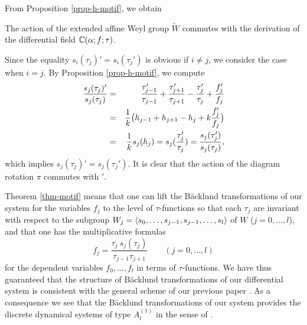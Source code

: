 From Proposition \ref{prop-h-motif}, we obtain 
\begin{thm}
The action of the extended affine Weyl group $\widetilde{W}$ commutes 
with the derivation of the differential field ${\Bbb C}(\alpha;f;\tau)$. 
\end{thm}
\begin{pf} Since the equality $s_i(\tau_j)'=s_i(\tau_j')$ is obvious if $i\ne j$, 
we consider the case when $i=j$.  
By Proposition \ref{prop-h-motif}, we compute 
\begin{eqnarray}
\frac{s_j(\tau_j)'}{s_j(\tau_j)}&=&
\frac{\tau_{j-1}'}{\tau_{j-1}}+\frac{\tau_{j+1}'}{\tau_{j+1}}-\frac{\tau_{j}'}{\tau_{j}}
+\frac{f_j'}{f_j}\\
&=& \frac{1}{k}\big(h_{j-1}+h_{j+1}-h_j+k \frac{f_j'}{f_j}\big)\notag\\
&=& \frac{1}{k} s_j(h_j) =s_j(\frac{\tau_j'}{\tau_j})=\frac{s_j(\tau_j')}{s_j(\tau_j)},
\notag
\end{eqnarray}
which implies $s_j(\tau_j)'=s_j(\tau_j')$.  
It is clear that the action of the diagram rotation $\pi$ commutes with $'$. 
\end{pf}

\noindent
Theorem \ref{thm-motif} means that one can lift the B\"acklund transformations 
of our system for the variables $f_j$ 
to the level of $\tau$-functions so that each $\tau_j$ are invariant 
with respect to the subgroup $W_j=\langle s_0,\ldots,s_{j-1},s_{j-1},\ldots,s_l \rangle$ 
of $W$ ($j=0,\ldots,l$),  
and that one has the multiplicative formulas 
\begin{equation}
f_j=\frac{\tau_j\ s_j(\tau_j)}{\tau_{j-1}\tau_{j+1}}\qquad(j=0,\ldots,l)
\end{equation}
for the dependent variables $f_0,\ldots,f_l$ 
in terms of $\tau$-functions. 
We have thus guaranteed that the structure of B\"acklund transformations 
of our differential system is consistent with the general scheme of 
our previous paper \cite{NY3}.  
As a consequence we see that the B\"acklund transformations of our system 
provides the discrete dynamical systems of type $A^{(1)}_l$ in the sense 
of \cite{NY3}.  

